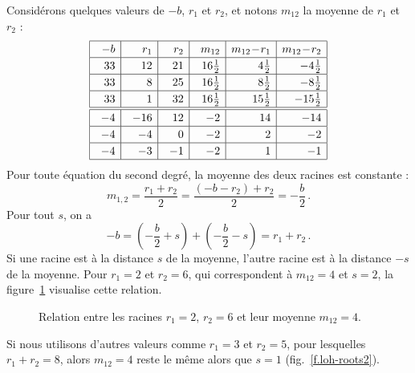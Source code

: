 Considérons quelques valeurs de $-b$, $r_1$ et $r_2$, et notons  $m_{12}$  la moyenne de $r_1$ et $r_2$ :
\[
\renewcommand{\arraystretch}{1.2}
\begin{array}{|@{\hspace{1em}}r|@{\hspace{1em}}r|@{\hspace{1em}}r|@{\hspace{1em}}r|r|r|}
\hline
-b& r_1 & r_2 & m_{12}& m_{12}\!-\!r_1 & m_{12}\!-\!r_2\\\hline
33 & 12 & 21 & 16\frac{1}{2}&4\frac{1}{2} & -4\frac{1}{2}  \\\hline
33 & 8 & 25 & 16\frac{1}{2}&8\frac{1}{2}&-8\frac{1}{2}\\\hline
33 & 1 & 32 & 16\frac{1}{2}&15\frac{1}{2}&-15\frac{1}{2}\\\hline
\hline
-4 & -16 & 12 & -2 &14& -14\\\hline
-4 & -4 & 0 & -2&2&-2 \\\hline
-4 & -3 & -1 & -2&1&-1 \\\hline
\end{array}
\]
Pour toute équation du second degré, la moyenne des deux racines est constante :
\[
m_{1,2}=\frac{r_1+r_2}{2}=
\frac{(-b-r_2)+r_2}{2}=
-\frac{b}{2}\,.
\]
Pour tout $s$, on a
\[
-b=\left(-\frac{b}{2}+s\right) + \left(-\frac{b}{2}-s\right)=r_1+r_2\,.
\]
Si une racine est à la distance $s$ de la moyenne, l'autre racine est à la distance $-s$ de la moyenne. Pour $r_1=2$ et $r_2=6$, qui correspondent à $m_{12}=4$ et $s=2$, la figure~\ref{f.loh-roots1} visualise cette relation.

\begin{figure}[htbp]
\centering
{}
\caption{Relation entre les racines $r_1=2$, $r_2=6$ et leur moyenne $m_{12}=4$.}
\label{f.loh-roots1}
\end{figure}
Si nous utilisons d'autres valeurs comme $r_1=3$ et $r_2=5$, pour lesquelles $r_1+r_2=8$, alors $m_{12}=4$ reste le même alors que $s=1$ (fig.~\ref{f.loh-roots2}).

